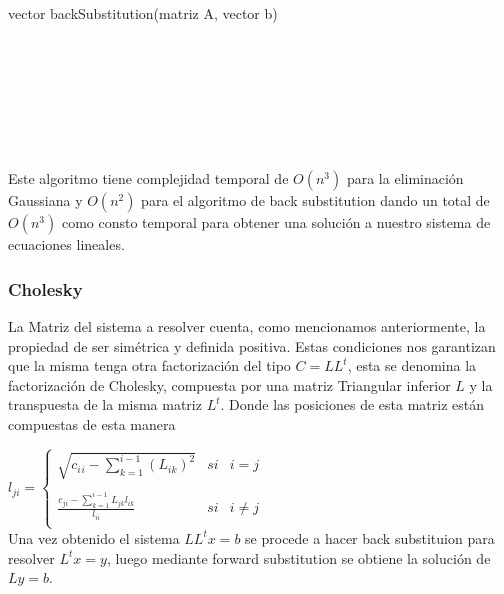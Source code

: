 \begin{algorithm}
    \begin{algorithmic}[1]\parskip=2mm
        \caption{vector backSubstitution(matriz A, vector b)}
        \\
        \\
        \\
        \\
        \\
        \\
    \end{algorithmic}
\end{algorithm}

Este algoritmo tiene complejidad temporal de $O(n^{3})$ para la eliminación Gaussiana y $O(n^{2})$ para el algoritmo de back substitution dando un total de $O(n^{3})$ como consto temporal para obtener una solución a nuestro sistema de ecuaciones lineales.

\newpage
\subsubsection{Cholesky}

La Matriz del sistema a resolver cuenta, como mencionamos anteriormente, la propiedad de ser simétrica y definida positiva. Estas condiciones nos garantizan que la misma tenga otra factorización del tipo $C=LL^{t}$, esta se denomina la factorización de Cholesky, compuesta por una matriz Triangular inferior $L$ y la transpuesta de la misma matriz $L^{t}$. Donde las posiciones de esta matriz están compuestas de esta manera

$l_{ji} =
\left\{
    \begin{array}{lcc}
        \sqrt{c{_i}{_i} - \sum\limits_{k=1}^{i-1} (L_{ik})^2} & si & i = j \\
        \\ \frac{c_{ji} - \sum\limits_{k=1}^{i-1} L_{jk}l_{ik}}{l_{ii}} & si & i \neq j \\
    \end{array}
\right.$ \\

Una vez obtenido el sistema $LL^tx=b$ se procede a hacer back substituion para resolver $L^tx=y$, luego mediante forward substitution se obtiene la solución de $Ly=b$.

